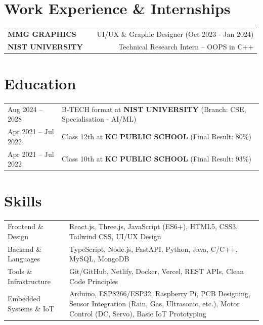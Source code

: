 \documentclass[a4paper,12pt]{article}
\begin{document}
\section{Work Experience \& Internships}
\begin{tabularx}{\linewidth}{@{}l X r@{}}
\textbf{MMG GRAPHICS} & \hfill & UI/UX \& Graphic Designer (Oct 2023 - Jan 2024) \\[3.75pt]
\textbf{NIST UNIVERSITY} & \hfill & Technical Research Intern -- OOPS in C++ \\[3.75pt]
\end{tabularx}

\section{Education}
\begin{tabularx}{\linewidth}{@{}l X@{}}	
Aug 2024 -- 2028 & B-TECH format at \textbf{NIST UNIVERSITY} \hfill  (Branch: CSE, Specialisation - AI/ML) \\

Apr 2021 -- Jul 2022 & Class 12th at \textbf{KC PUBLIC SCHOOL} \hfill  (Final Result: 80\%) \\

Apr 2021 -- Jul 2022 & Class 10th at \textbf{KC PUBLIC SCHOOL} \hfill  (Final Result: 93\%) \\
\end{tabularx}

\section{Skills}
\begin{tabularx}{\linewidth}{@{}l X@{}}
Frontend \& Design &  \normalsize{React.js, Three.js, JavaScript (ES6+), HTML5, CSS3, Tailwind CSS, UI/UX Design}\\
Backend \& Languages  &  \normalsize{TypeScript, Node.js, FastAPI, Python, Java, C/C++, MySQL, MongoDB}\\
Tools \& Infrastructure & \normalsize{Git/GitHub, Netlify, Docker, Vercel, REST APIs, Clean Code Principles}\\
Embedded Systems \& IoT & \normalsize{Arduino, ESP8266/ESP32, Raspberry Pi, PCB Designing, Sensor Integration (Rain, Gas, Ultrasonic, etc.), Motor Control (DC, Servo), Basic IoT Prototyping}\\
\end{tabularx}
\end{document}
